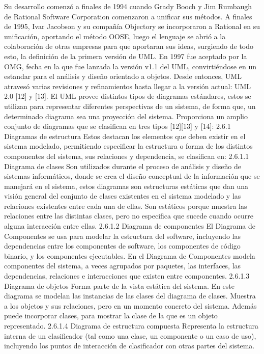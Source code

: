 Su desarrollo comenzó a finales de 1994 cuando Grady Booch y Jim Rumbaugh de Rational Software Corporation comenzaron a unificar sus métodos. A finales de 1995, Ivar Jacobson y su compañía Objectory se incorporaron a Rational en su unificación, aportando el método OOSE, luego  el lenguaje se abrió a la colaboración de otras empresas para que aportaran sus ideas, surgiendo de todo esto, la definición de la primera versión de UML. En 1997 fue aceptado por la OMG, fecha en la que fue lanzada la versión v1.1 del UML, convirtiéndose en un estandar para el análisis y diseño orientado a objetos. Desde entonces, UML atravesó varias revisiones y refinamientos hasta llegar a la versión actual: UML 2.0 [12] y [13].
El UML provee distintos tipos de diagramas estándares, estos se utilizan para representar diferentes perspectivas de un sistema, de forma que, un determinado diagrama sea una proyección del sistema. Proporciona un amplio conjunto de diagramas que se clasifican en tres tipos [12][13] y [14]:
2.6.1	Diagramas de estructura
Estos destacan los elementos que deben existir en el sistema modelado, permitiendo especificar la estructura o forma de los distintos componentes del sistema, sus relaciones y dependencia, se clasifican en:
2.6.1.1	Diagrama de clases 
Son utilizados durante el proceso de análisis y diseño de sistemas informáticos, donde se crea el diseño conceptual de la información que se manejará en el sistema, estos diagramas son estructuras estáticas que dan una visión general del conjunto de clases existentes en el sistema modelado y las relaciones existentes entre cada una de ellas. Son estáticos porque muestra las relaciones entre las distintas clases, pero no especifica que sucede cuando ocurre alguna interacción entre ellas.
2.6.1.2	Diagrama de componentes 
El Diagrama de Componentes se usa para modelar la estructura del software, incluyendo las dependencias entre los componentes de software, los componentes de código binario, y los componentes ejecutables. En el Diagrama de Componentes modela componentes del sistema, a veces agrupados por paquetes, las interfaces, las dependencias, relaciones e interacciones que existen entre componentes.
2.6.1.3	Diagrama de objetos 
Forma parte de la vista estática del sistema. En este diagrama se modelan las instancias de las clases del diagrama de clases. Muestra a los objetos y sus relaciones, pero en un momento concreto del sistema. Además puede incorporar clases, para mostrar la clase de la que es un objeto representado.
2.6.1.4	Diagrama de estructura compuesta 
Representa la estructura interna de un clasificador (tal como una clase, un componente o un caso de uso), incluyendo los puntos de interacción de clasificador con otras partes del sistema.
